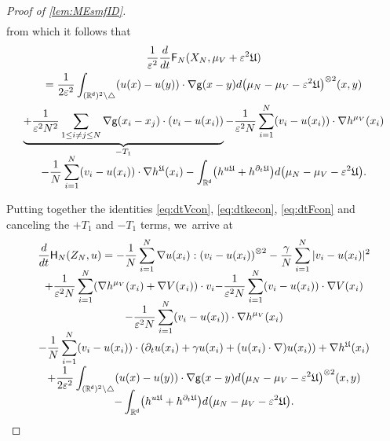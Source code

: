 \documentclass[10pt]{amsart}
\theoremstyle{plain}
\theoremstyle{definition}
\DeclarePairedDelimiter{\pa}{\lparen}{\rparen}
\let\div\relax
\DeclareMathOperator{\div}{\mathrm{div}}
\newcommand{\R}{{\mathbb{R}}}
\let\ga\gamma
\let\vep\varepsilon
\let\nab\nabla
\let\p\partial
\let\ux X
\let\uz Z
\newcommand{\Uu}{\mathfrak{U}}
\newcommand{\Fr}{\mathsf{F}}
\newcommand{\Hr}{\mathsf{H}}
\renewcommand{\d}{\mathsf{d}}
\newcommand{\g}{{\mathsf{g}}}
\begin{document}
\begin{proof}[Proof of \cref{lem:MEsmfID}]
\begin{multline*}
\end{multline*}
from which it follows that\vspace*{-5pt}
\begin{multline}\label{eq:dtFcon}
\frac{1}{\vep^2}\frac{d}{dt} \Fr_N(\ux_N, \mu_V + \vep^2\Uu)\\
= \frac{1}{2\vep^2}\int_{(\R^\d)^2\setminus\triangle} \pa*{u(x)-u(y)}\cdot\nabla\g(x-y)d\pa*{\mu_N-\mu_V-\vep^2\Uu}^{\otimes 2}(x,y) \\
\underbrace{+\frac{1}{\vep^2 N^2}\sum_{1\leq i\neq j\leq N} \nabla\g(x_i-x_j)\cdot \pa*{v_i - u(x_i)}}_{-T_1} -\frac{1}{\vep^2 N}\sum_{i=1}^N (v_i-u(x_i))\cdot\nabla h^{\mu_V}(x_i) \\[-5pt]
- \frac{1}{N}\sum_{i=1}^N (v_i-u(x_i)) \cdot \nabla h^{\Uu}(x_i) -\int_{\R^\d}\pa*{\div h^{u\Uu}+h^{\p_t\Uu}}d\pa*{\mu_N-\mu_V-\vep^2\Uu}.
\end{multline}

Putting together the identities \eqref{eq:dtVcon}, \eqref{eq:dtkecon}, \eqref{eq:dtFcon} and canceling the $+T_1$ and $-T_{1}$ terms, we~arrive at\vspace*{-8pt}
\begin{multline}\label{eq:dtHcon}
\frac{d}{dt}\Hr_{N}(\uz_N,u) = -\frac{1}{N}\sum_{i=1}^N \nab u(x_i) : \pa*{v_i - u(x_i)}^{\otimes2}-\frac{\ga}{N}\sum_{i=1}^N |v_i-u(x_i)|^2\\[-7pt]
{+\frac{1}{\vep^2 N}\sum_{i=1}^N\pa*{\nabla h^{\mu_V}(x_i) + \nabla V(x_i)}\cdot v_i {-\frac{1}{\vep^2 N}\sum_{i=1}^N \pa*{v_i - u(x_i)}\cdot\nabla V(x_i)}} \\[-7pt]
{-\frac{1}{\vep^2 N}\sum_{i=1}^N (v_i-u(x_i))\cdot\nabla h^{\mu_V}(x_i)}\\[-7pt]
{- \frac{1}{N}\sum_{i=1}^N \pa*{v_i - u(x_i)}\cdot\pa*{\p_t u(x_i) + \ga u(x_i) + (u(x_i)\cdot\nabla) u(x_i)} + \nabla h^{\Uu}(x_i)} \\[-3pt]
+\frac{1}{2\vep^2}\int_{(\R^\d)^2\setminus\triangle} \pa*{u(x)-u(y)}\cdot\nabla\g(x-y)d\pa*{\mu_N-\mu_V-\vep^2\Uu}^{\otimes 2}(x,y) \\[-7pt]
-\int_{\R^\d}\pa*{\div h^{u\Uu}+h^{\p_t\Uu}}d\pa*{\mu_N-\mu_V-\vep^2\Uu}.
\end{multline}


\end{proof}
\end{document}
